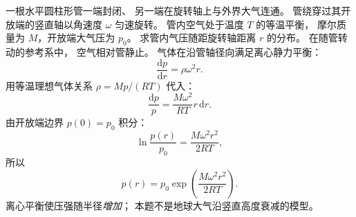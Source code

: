 一根水平圆柱形管一端封闭、
另一端在旋转轴上与外界大气连通。
管绕穿过其开放端的竖直轴以角速度
$\omega$ 匀速旋转。
管内空气处于温度 $T$ 的等温平衡，
摩尔质量为 $M$，开放端大气压为 $p_0$。
求管内气压随距旋转轴距离 $r$ 的分布。
\exsolution
在随管转动的参考系中，
空气相对管静止。
气体在沿管轴径向满足离心静力平衡：
\[
\frac{\mathrm dp}{\mathrm dr}=\rho\omega^2r.
\]
用等温理想气体关系
$\rho=Mp/(RT)$ 代入：
\[
\frac{\mathrm dp}{p}
=\frac{M\omega^2}{RT}r\,\mathrm dr.
\]
由开放端边界 $p(0)=p_0$ 积分：
\[
\ln\frac{p(r)}{p_0}
=\frac{M\omega^2r^2}{2RT},
\]
所以
\[
\boxed{p(r)=p_0
\exp\left(\frac{M\omega^2r^2}{2RT}\right)}.
\]
\excheck 离心平衡使压强随半径\emph{增加}；
本题不是地球大气沿竖直高度衰减的模型。
